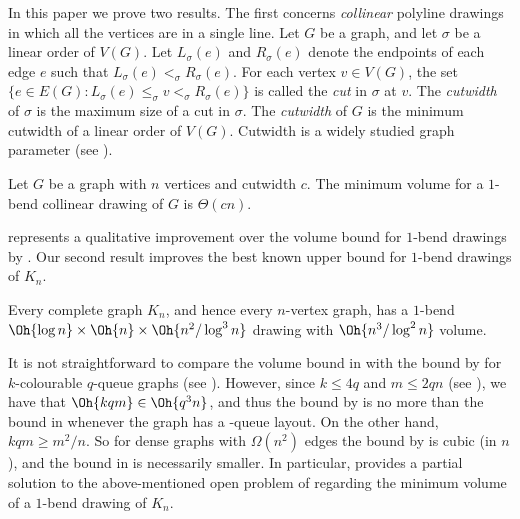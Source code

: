 \documentclass[10pt,a4paper]{article}
\begin{document}
In this paper we prove two results.  The first concerns \emph{collinear}
polyline drawings in which all the vertices are in a single line.  Let $G$ be a
graph, and let $\sigma$ be a linear order of $V(G)$.  Let $L_\sigma(e)$ and
$R_\sigma(e)$ denote the endpoints of each edge $e$ such that
$L_\sigma(e)<_\sigma R_\sigma(e)$. For each vertex $v\in V(G)$, the set $\{e\in
E(G):L_\sigma(e)\leq_\sigma v<_\sigma R_\sigma(e)\}$ is called the \emph{cut}
in $\sigma$ at $v$. The \emph{cutwidth} of $\sigma$ is the maximum size of a
cut in $\sigma$. The \emph{cutwidth} of $G$ is the minimum cutwidth of a linear
order of $V(G)$.  Cutwidth is a widely studied graph parameter (see \citep{DPS-GraphLayouts}).

\begin{theorem}
Let $G$ be a graph with $n$ vertices and cutwidth $c$.  The minimum volume for
a $1$-bend collinear drawing of $G$ is $\Theta(cn)$.
\end{theorem}

 represents a qualitative improvement over the
 volume bound for $1$-bend drawings by \citet{DujWoo-Subdivisions}. Our
second result improves the best known upper bound for $1$-bend drawings of
$K_n$. 

\begin{theorem}
Every complete graph $K_n$, and hence every $n$-vertex graph, has a $1$-bend
$\Oh{\log n}\times\Oh{n}\times\Oh{n^2/\log^3n}$ drawing with $\Oh{n^3/\log^2 n}$
volume.
\end{theorem}

It is not straightforward to compare the volume bound in  with the
 bound by \citet{DujWoo-Subdivisions} for $k$-colourable $q$-queue
graphs (see ). However, since $k\leq 4q$ and $m\leq
2qn$ (see \citep{DujWoo-LinearLayouts}), we have that $\Oh{kqm} \in \Oh{q^3n}$,
and thus the  bound by \citet{DujWoo-Subdivisions} is no more than the 
bound in  whenever the graph has a -queue
layout. On the other hand, $kqm\geq m^2/n$. So for dense graphs with
$\Omega(n^2)$ edges the  bound  by \citet{DujWoo-Subdivisions} is cubic
(in $n$), and the bound in  is necessarily smaller. In particular,
 provides a partial solution to the above-mentioned open problem
of \citet{Wismath-TR04} regarding the minimum volume of a $1$-bend drawing of
$K_n$.

\end{document}
